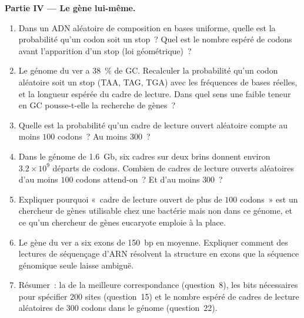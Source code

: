 \begin{problem}
\medskip
\noindent\textbf{Partie IV --- Le gène lui-même.}
\begin{enumerate}[resume]
  \item Dans un ADN aléatoire de composition en bases uniforme, quelle
        est la probabilité qu'un codon soit un stop~? Quel est le
        nombre espéré de codons avant l'apparition d'un stop (loi
        géométrique)~?
  \item Le génome du ver a \qty{38}{\%} de GC. Recalculer la
        probabilité qu'un codon aléatoire soit un stop (TAA, TAG, TGA)
        avec les fréquences de bases réelles, et la longueur espérée du
        cadre de lecture. Dans quel sens une faible teneur en GC
        pousse-t-elle la recherche de gènes~?
  \item Quelle est la probabilité qu'un cadre de lecture ouvert
        aléatoire compte au moins $100$ codons~? Au moins $300$~?
  \item Dans le génome de \qty{1.6}{Gb}, six cadres sur deux brins
        donnent environ $3.2\times 10^{9}$ départs de codons. Combien
        de cadres de lecture ouverts aléatoires d'au moins $100$ codons
        attend-on~? Et d'au moins $300$~?
  \item Expliquer pourquoi «~cadre de lecture ouvert de plus de $100$
        codons~» est un chercheur de gènes utilisable chez une bactérie
        mais non dans ce génome, et ce qu'un chercheur de gènes
        eucaryote emploie à la place.
  \item Le gène du ver a six exons de \qty{150}{bp} en moyenne.
        Expliquer comment des lectures de séquençage d'ARN résolvent la
        structure en exons que la séquence génomique seule laisse
        ambiguë.
  \item Résumer~: la  de la meilleure correspondance
        (question~8), les bits nécessaires pour spécifier $200$ sites
        (question~15) et le nombre espéré de cadres de lecture
        aléatoires de $300$ codons dans le génome (question~22).
\end{enumerate}
\end{problem}

